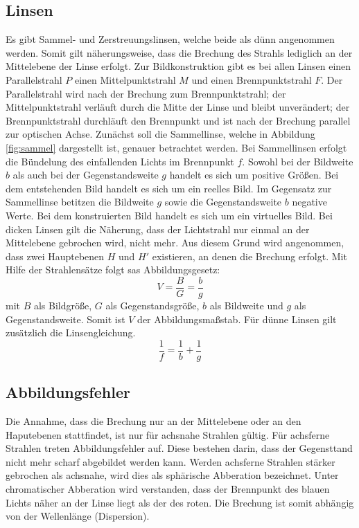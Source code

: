 \subsection{Linsen}
Es gibt Sammel- und Zerstreuungslinsen, welche beide als dünn angenommen werden. Somit gilt näherungsweise, dass die Brechung des Strahls lediglich an der Mittelebene der Linse erfolgt. Zur Bildkonstruktion gibt es bei allen Linsen einen Parallelstrahl $P$ einen Mittelpunktstrahl $M$ und einen Brennpunktstrahl $F$. Der Parallelstrahl wird nach der Brechung zum Brennpunktstrahl; der Mittelpunktstrahl verläuft durch die Mitte der Linse und bleibt unverändert; der Brennpunktstrahl durchläuft den Brennpunkt und ist nach der Brechung parallel zur optischen Achse.
Zunächst soll die Sammellinse, welche in Abbildung \ref{fig:sammel} dargestellt ist, genauer betrachtet werden.
 Bei Sammellinsen erfolgt die Bündelung des einfallenden Lichts im Brennpunkt $f$. Sowohl bei der Bildweite $b$ als auch bei der Gegenstandsweite $g$ handelt es sich um positive Größen. Bei dem entstehenden Bild handelt es sich um ein reelles Bild.
Im Gegensatz zur Sammellinse betitzen die Bildweite $g$ sowie die Gegenstandsweite $b$ negative Werte. Bei dem konstruierten Bild handelt es sich um ein virtuelles Bild.
Bei dicken Linsen gilt die Näherung, dass der Lichtstrahl nur einmal an der Mittelebene gebrochen wird, nicht mehr. Aus diesem Grund wird angenommen, dass zwei Hauptebenen $H$ und $H'$ existieren, an denen die Brechung erfolgt.
Mit Hilfe der Strahlensätze folgt sas Abbildungsgesetz:
\begin{equation}
  \label{eqn:abbildung}
  V=\frac{B}{G}=\frac{b}{g}
\end{equation}
mit $B$ als Bildgröße, $G$ als Gegenstandsgröße, $b$ als Bildweite und $g$ als Gegenstandsweite. Somit ist $V$ der Abbildungsmaßstab.
Für dünne Linsen gilt zusätzlich die Linsengleichung.
\begin{equation}
  \label{eqn:linse}
  \frac{1}{f}=\frac{1}{b}+\frac{1}{g}
\end{equation}

\subsection{Abbildungsfehler}
Die Annahme, dass die Brechung nur an der Mittelebene oder an den Haputebenen stattfindet, ist nur für achsnahe Strahlen gültig. Für achsferne Strahlen treten Abbildungsfehler auf. Diese bestehen darin, dass der Gegensttand nicht mehr scharf abgebildet werden kann. Werden achsferne Strahlen stärker gebrochen als achsnahe, wird dies als sphärische Abberation bezeichnet.
Unter chromatischer Abberation wird verstanden, dass der Brennpunkt des blauen Lichts näher an der Linse liegt als der des roten. Die Brechung ist somit abhängig von der Wellenlänge (Dispersion).
